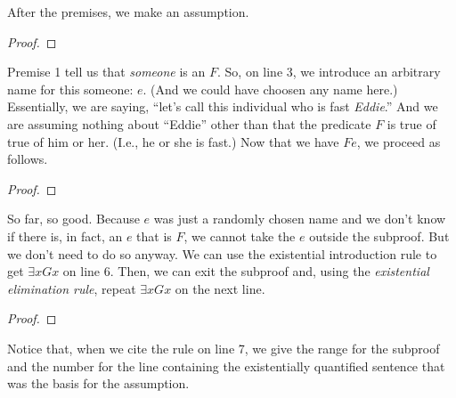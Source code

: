 \noindent After the premises, we make an assumption.
\begin{proof}
	 \pr{}
	 \pr{}
	\open
		 \as{}
\end{proof}
Premise 1 tell us that \emph{someone} is an $F$.  So, on line 3, we introduce an arbitrary name for this someone: $e$. (And we could have choosen any name here.) Essentially, we are saying, ``let's call this individual who is fast \textit{Eddie}.'' And we are assuming nothing about ``Eddie'' other than that the predicate $F$ is true of true of him or her. (I.e., he or she is fast.) Now that we have $Fe$, we proceed as follows. 
\begin{proof}
	 \pr{}
	 \pr{}
	\open
		 \as{}
		 
\end{proof}
So far, so good. Because $e$ was just a randomly chosen name and we don't know if there is, in fact, an $e$ that is $F$, we cannot take the $e$ outside the subproof. But we don't need to do so anyway. We can use the existential introduction rule to get $\exists xGx$ on line 6. Then, we can exit the subproof and, using the \textit{existential elimination rule}, repeat $\exists xGx$ on the next line.
\begin{proof}
	 \pr{}
	 \pr{}
	\open
		 \as{}
		 
	\close
\end{proof}
Notice that, when we cite the rule on line 7, we give the range for the subproof and the number for the line containing the existentially quantified sentence that was the basis for the assumption.

	\begin{quote}
	\end{quote}

